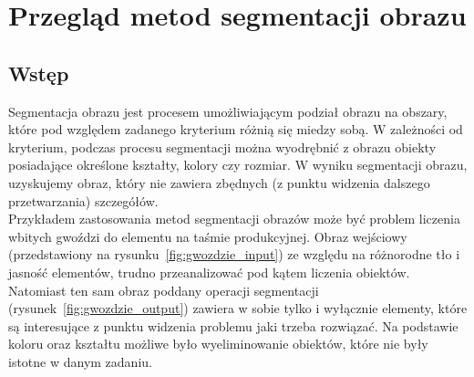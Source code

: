 \section{Przegląd metod segmentacji obrazu}
\subsection{Wstęp}
Segmentacja obrazu jest procesem umożliwiającym podział obrazu na obszary, które pod względem zadanego kryterium różnią się miedzy sobą. W zależności od kryterium, podczas procesu segmentacji można wyodrębnić z obrazu obiekty posiadające określone kształty, kolory czy rozmiar. W wyniku segmentacji obrazu, uzyskujemy obraz, który nie zawiera zbędnych (z punktu widzenia dalszego przetwarzania) szczegółów.\\
Przykładem zastosowania metod segmentacji obrazów może być problem liczenia wbitych gwoździ do elementu na taśmie produkcyjnej. Obraz wejściowy (przedstawiony na rysunku~\ref{fig:gwozdzie_input}) ze względu na różnorodne tło i jasność elementów, trudno przeanalizować pod kątem liczenia obiektów. Natomiast ten sam obraz poddany operacji segmentacji (rysunek~\ref{fig:gwozdzie_output}) zawiera w sobie tylko i wyłącznie elementy, które są interesujące z punktu widzenia problemu jaki trzeba rozwiązać. Na podstawie koloru oraz kształtu możliwe było wyeliminowanie obiektów, które nie były istotne w danym zadaniu.

